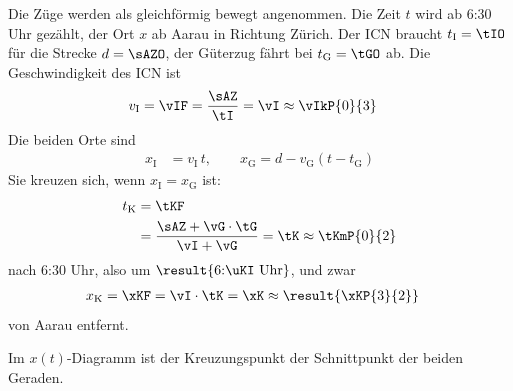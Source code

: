 Die Züge werden als gleichförmig bewegt angenommen. Die Zeit $t$ wird ab 6:30 Uhr gezählt, der Ort $x$ ab Aarau in Richtung Zürich. Der ICN braucht $t_\mathrm{I} = \tIO$ für die Strecke $d = \sAZO$, der Güterzug fährt bei $t_\mathrm{G} = \tGO$ ab. Die Geschwindigkeit des ICN ist
\begin{align}
 v_\mathrm{I} &= \vIF = \frac{\sAZ}{\tI} = \vI \approx \vIkP{0}{3}
\end{align}
Die beiden Orte sind
\begin{align}
 x_\mathrm{I} &= v_\mathrm{I}\,t, \qquad x_\mathrm{G} = d - v_\mathrm{G}\left(t-t_\mathrm{G}\right)
\end{align}
Sie kreuzen sich, wenn $x_\mathrm{I} = x_\mathrm{G}$ ist:
\begin{align}
 t_\mathrm{K} &= \tKF \\
   &= \frac{\sAZ+\vG\cdot\tG}{\vI+\vG} = \tK \approx \tKmP{0}{2}
\end{align}
nach 6:30 Uhr, also um $\result{\text{6:\uKI~Uhr}}$, und zwar
\begin{align}
 x_\mathrm{K} &= \xKF = \vI\cdot\tK = \xK \approx \result{\xKP{3}{2}}
\end{align}
von Aarau entfernt.

\begin{center}
\end{center}
Im $x(t)$-Diagramm ist der Kreuzungspunkt der Schnittpunkt der beiden Geraden.
